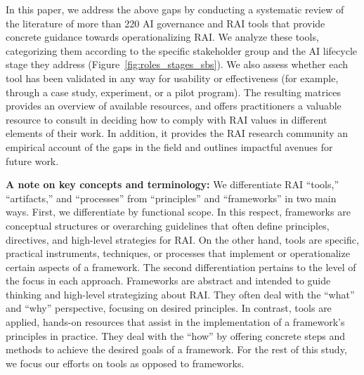 In this paper, we address the above gaps by conducting a systematic review of the literature of more than 220 AI governance and RAI tools that provide concrete guidance towards operationalizing RAI. We analyze these tools, categorizing them according to the specific stakeholder group and the AI lifecycle stage they address (Figure~\ref{fig:roles_stages_sbs}). We also assess whether each tool has been validated in any way for usability or effectiveness (for example, through a case study, experiment, or a pilot program). The resulting matrices provides an overview of available resources, and offers practitioners a valuable resource to consult in deciding how to comply with RAI values in different elements of their work. In addition, it provides the RAI research community an empirical account of the gaps in the field and outlines impactful avenues for future work.


\textbf{A note on key concepts and terminology:} We differentiate RAI ``tools,'' ``artifacts,'' and ``processes'' from ``principles'' and ``frameworks'' in two main ways. First, we differentiate by functional scope. In this respect, frameworks are conceptual structures or overarching guidelines that often define principles, directives, and high-level strategies for RAI. On the other hand, tools are specific, practical instruments, techniques, or processes that implement or operationalize certain aspects of a framework. The second differentiation pertains to the level of the focus in each approach. Frameworks are abstract and intended to guide thinking and high-level strategizing about RAI. They often deal with the ``what'' and ``why'' perspective, focusing on desired principles. In contrast, tools are applied, hands-on resources that assist in the implementation of a framework's principles in practice. They deal with the ``how'' by offering concrete steps and methods to achieve the desired goals of a framework. For the rest of this study, we focus our efforts on tools as opposed to frameworks. 



